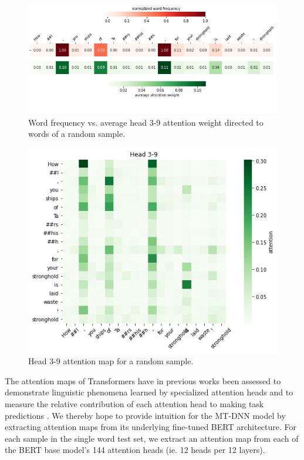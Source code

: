 \documentclass[11pt,a4paper]{article}
\begin{document}
\begin{figure}
  \centering
  \includegraphics[scale=0.3]{head_3-9_tf_avg.png}
  \captionsetup{justification=centering}
  \caption{\label{fig:head_3-9_tf_avg} Word frequency vs. average head 3-9 attention weight directed to words of a random sample.}
\end{figure}

\begin{figure}
  \centering
  \includegraphics[scale=0.45]{head_3-9.png}
  \captionsetup{justification=centering}
  \caption{\label{fig:head_3-9} Head 3-9 attention map for a random sample.}
\end{figure}

The attention maps of Transformers have in previous works been assessed to demonstrate linguistic phenomena learned by specialized attention heads \citep{1905-09418, 1906-04341} and to measure the relative contribution of each attention head to making task predictions \citep{1905-09418, 1905-10650}. We thereby hope to provide intuition for the MT-DNN model by extracting attention maps from its underlying fine-tuned BERT architecture. For each sample in the single word test set, we extract an attention map from each of the BERT base model's 144 attention heads (ie. 12 heads per 12 layers).
\end{document}
